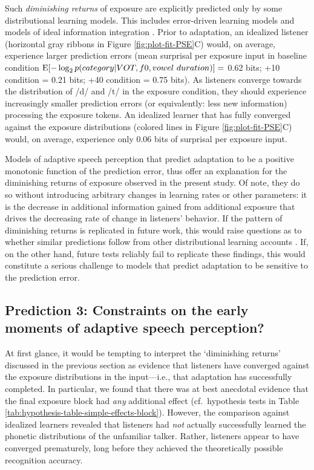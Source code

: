 \documentclass[
  11pt,
  man,mask,floatsintext]{apa6}
\begin{document}
Such \emph{diminishing returns} of exposure are explicitly predicted only by some distributional learning models. This includes error-driven learning models \autocites[e.g.,][]{davis-sohoglu2020,harmon2019,olejarczuk2018,sohoglu-davis2016} and models of ideal information integration \autocites[ideal adaptors,][]{kleinschmidt-jaeger2015,kleinschmidt-jaeger2016}. Prior to adaptation, an idealized listener (horizontal gray ribbons in Figure \ref{fig:plot-fit-PSE}C) would, on average, experience larger prediction errors (mean surprisal per exposure input in baseline condition \({\rm E}[-\log_2 p(category | VOT, f0, vowel\ duration)] =\) 0.62 bits; +10 condition = 0.21 bits; +40 condition = 0.75 bits). As listeners converge towards the distribution of /d/ and /t/ in the exposure condition, they should experience increasingly smaller prediction errors (or equivalently: less new information) processing the exposure tokens. An idealized learner that has fully converged against the exposure distributions (colored lines in Figure \ref{fig:plot-fit-PSE}C) would, on average, experience only 0.06 bits of surprisal per exposure input.

Models of adaptive speech perception that predict adaptation to be a positive monotonic function of the prediction error, thus offer an explanation for the diminishing returns of exposure observed in the present study. Of note, they do so without introducing arbitrary changes in learning rates or other parameters: it is the decrease in additional information gained from additional exposure that drives the decreasing rate of change in listeners' behavior. If the pattern of diminishing returns is replicated in future work, this would raise questions as to whether similar predictions follow from other distributional learning accounts \autocites[e.g., C-CuRE normalization,][]{mcmurray-jongman2011}[exemplar models,][]{johnson1997}[DNNs,][]{magnuson2020}. If, on the other hand, future tests reliably fail to replicate these findings, this would constitute a serious challenge to models that predict adaptation to be sensitive to the prediction error.

\subsection{Prediction 3: Constraints on the early moments of adaptive speech perception?}\label{prediction-3-constraints-on-the-early-moments-of-adaptive-speech-perception}

At first glance, it would be tempting to interpret the `diminishing returns' discussed in the previous section as evidence that listeners have converged against the exposure distributions in the input---i.e., that adaptation has successfully completed. In particular, we found that there was at best anecdotal evidence that the final exposure block had \emph{any} additional effect (cf.~hypothesis tests in Table \ref{tab:hypothesis-table-simple-effects-block}). However, the comparison against idealized learners revealed that listeners had \emph{not} actually successfully learned the phonetic distributions of the unfamiliar talker. Rather, listeners appear to have converged prematurely, long before they achieved the theoretically possible recognition accuracy.
\end{document}
